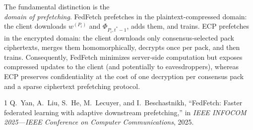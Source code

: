 \documentclass[conference]{IEEEtran}
\begin{document}
The fundamental distinction is the \\\emph{domain of prefetching}.
FedFetch prefetches in the plaintext-compressed domain: the client downloads $w^{(P_i)}$ and $\Phi_{P_i,t^*-1}$, adds them, and trains.
ECP prefetches in the encrypted domain: the client downloads only consensus-selected pack ciphertexts, merges them homomorphically, decrypts once per pack, and then trains.
Consequently, FedFetch minimizes server-side computation but exposes compressed updates to the client (and potentially to eavesdroppers), whereas ECP preserves confidentiality at the cost of one decryption per consensus pack and a sparse ciphertext prefetching protocol.


\begin{thebibliography}{1}
Q.~Yan, A.~Liu, S.~He, M.~Lecuyer, and I.~Beschastnikh, ``FedFetch: Faster federated learning with adaptive downstream prefetching,'' in \emph{IEEE INFOCOM 2025---IEEE Conference on Computer Communications}, 2025.
\end{thebibliography}
\end{document}
